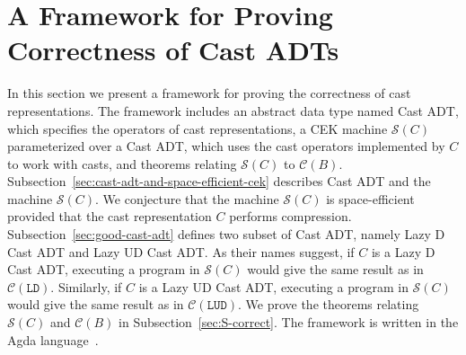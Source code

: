 \documentclass[runningheads]{llncs}
\newcommand{\CMachine}[1]{\ensuremath{\mathcal{C}(#1)}}
\newcommand{\LDMachine}{\CMachine{\BLD}}
\newcommand{\LUDMachine}{\CMachine{\BLUD}}
\newcommand{\SMachine}[1]{\ensuremath{\mathcal{S}(#1)}}
\newcommand{\BLD}[0]{\ensuremath{\mathtt{LD}}}
\newcommand{\BLUD}[0]{\ensuremath{\mathtt{LUD}}}
\begin{document}
\section{A Framework for Proving Correctness of Cast ADTs}
\label{sec:framework}

In this section we present a framework for proving the 
correctness of cast representations. The framework includes an abstract data 
type named Cast ADT, which specifies the operators of cast representations, 
a CEK machine $\SMachine{C}$ parameterized over a Cast ADT,
which uses the cast operators implemented by $C$ to work with casts, 
and theorems relating $\SMachine{C}$ to $\CMachine{B}$.
%
Subsection~\ref{sec:cast-adt-and-space-efficient-cek} describes Cast ADT and the 
machine \SMachine{C}. We conjecture that the machine \SMachine{C} is 
space-efficient provided that the cast representation $C$ performs compression.
%
Subsection~\ref{sec:good-cast-adt} defines two subset of Cast ADT, namely Lazy D 
Cast ADT and Lazy UD Cast ADT. As their names suggest, if $C$ is a Lazy D Cast 
ADT, executing a program in $\SMachine{C}$ would give the same result as in 
$\LDMachine$. Similarly, if $C$ is a Lazy UD Cast ADT, executing a program in 
$\SMachine{C}$ would give the same result as in $\LUDMachine$.
%
We prove the theorems relating \SMachine{C} and \CMachine{B} in
Subsection~\ref{sec:S-correct}.
The framework is written in the Agda language~\citep{norell2008dependently}.
\end{document}
